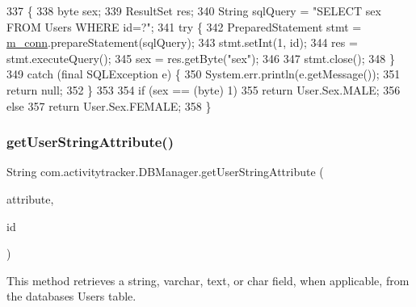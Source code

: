 \begin{DoxyCode}
337                                              \{
338         byte sex;
339         ResultSet res;
340         String sqlQuery = \textcolor{stringliteral}{"SELECT sex FROM Users WHERE id=?"};
341         \textcolor{keywordflow}{try} \{
342             PreparedStatement stmt = \mbox{\hyperlink{classcom_1_1activitytracker_1_1_d_b_manager_a064088d13ac09eb147fdc19268771521}{m\_conn}}.prepareStatement(sqlQuery);
343             stmt.setInt(1, \textcolor{keywordtype}{id});
344             res = stmt.executeQuery();
345             sex = res.getByte(\textcolor{stringliteral}{"sex"});
346 
347             stmt.close();
348         \}
349         \textcolor{keywordflow}{catch} (\textcolor{keyword}{final} SQLException e) \{
350             System.err.println(e.getMessage());
351             \textcolor{keywordflow}{return} null;
352         \}
353 
354         \textcolor{keywordflow}{if} (sex == (byte) 1)
355             \textcolor{keywordflow}{return} User.Sex.MALE;
356         \textcolor{keywordflow}{else}
357             \textcolor{keywordflow}{return} User.Sex.FEMALE;
358     \}
\end{DoxyCode}
\mbox{\label{classcom_1_1activitytracker_1_1_d_b_manager_a20f726c054d6c8a6fc3ce629d87f1114}} 
\subsubsection{\texorpdfstring{get\+User\+String\+Attribute()}{getUserStringAttribute()}}
{\footnotesize\ttfamily String com.\+activitytracker.\+D\+B\+Manager.\+get\+User\+String\+Attribute (\begin{DoxyParamCaption}\item[{final \mbox{\hyperlink{enumcom_1_1activitytracker_1_1_user_attribute}{User\+Attribute}}}]{attribute,  }\item[{final int}]{id }\end{DoxyParamCaption})}

This method retrieves a string, varchar, text, or char field, when applicable, from the database\textquotesingle{}s Users table.

